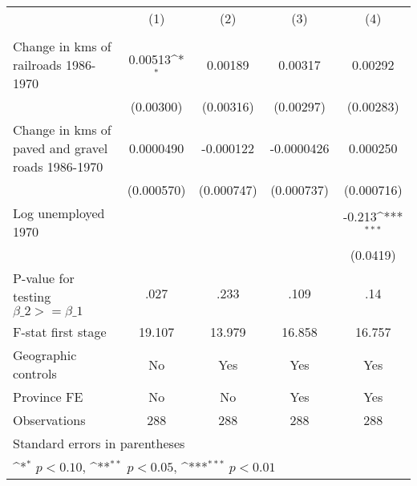 {
\def\sym#1{\ifmmode^{#1}\else\(^{#1}\)\fi}
\begin{tabular}{l*{4}{c}}
\hline\hline
                &\multicolumn{1}{c}{(1)}&\multicolumn{1}{c}{(2)}&\multicolumn{1}{c}{(3)}&\multicolumn{1}{c}{(4)}\\
                &\multicolumn{1}{c}{}&\multicolumn{1}{c}{}&\multicolumn{1}{c}{}&\multicolumn{1}{c}{}\\
\hline
Change in kms of railroads 1986-1970&  0.00513\sym{*}  &  0.00189         &  0.00317         &  0.00292         \\
                &(0.00300)         &(0.00316)         &(0.00297)         &(0.00283)         \\
[1em]
Change in kms of paved and gravel roads 1986-1970&0.0000490         &-0.000122         &-0.0000426         & 0.000250         \\
                &(0.000570)         &(0.000747)         &(0.000737)         &(0.000716)         \\
[1em]
Log unemployed 1970&                  &                  &                  &   -0.213\sym{***}\\
                &                  &                  &                  & (0.0419)         \\
\hline
P-value for testing $\beta\_{2} >= \beta\_{1}$&     .027         &     .233         &     .109         &      .14         \\
F-stat first stage&   19.107         &   13.979         &   16.858         &   16.757         \\
Geographic controls&       No         &      Yes         &      Yes         &      Yes         \\
Province FE     &       No         &       No         &      Yes         &      Yes         \\
Observations    &      288         &      288         &      288         &      288         \\
\hline\hline
\multicolumn{5}{l}{\footnotesize Standard errors in parentheses}\\
\multicolumn{5}{l}{\footnotesize \sym{*} \(p<0.10\), \sym{**} \(p<0.05\), \sym{***} \(p<0.01\)}\\
\end{tabular}
}

